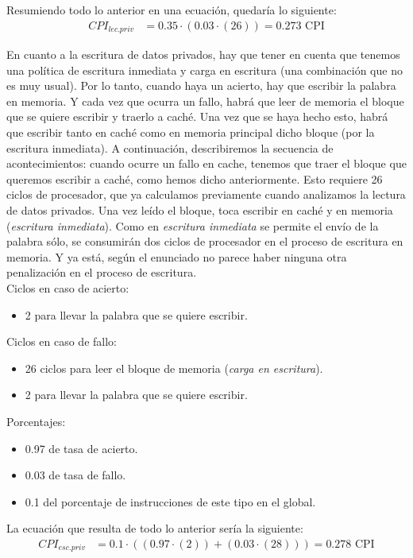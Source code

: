 \documentclass[12pt,a4paper]{article}
\begin{document}
Resumiendo todo lo anterior en una ecuación, quedaría lo siguiente:
\begin{align*}
CPI_{lec.priv}&=0.35\cdot (0.03\cdot (26))=0.273\text{ CPI}
\end{align*}

En cuanto a la escritura de datos privados, hay que tener en cuenta que tenemos una política de escritura inmediata y carga en escritura (una combinación que no es muy usual). Por lo tanto, cuando haya un acierto, hay que escribir la palabra en memoria. Y cada vez que ocurra un fallo, habrá que leer de memoria el bloque que se quiere escribir y traerlo a caché. Una vez que se haya hecho esto, habrá que escribir tanto en caché como en memoria principal dicho bloque (por la escritura inmediata). A continuación, describiremos la secuencia de acontecimientos: cuando ocurre un fallo en cache, tenemos que traer el bloque que queremos escribir a caché, como hemos dicho anteriormente. Esto requiere 26 ciclos de procesador, que ya calculamos previamente cuando analizamos la lectura de datos privados. Una vez leído el bloque, toca escribir en caché y en memoria (\textit{escritura inmediata}). Como en \textit{escritura inmediata} se permite el envío de la palabra sólo, se consumirán dos ciclos de procesador en el proceso de escritura en memoria. Y ya está, según el enunciado no parece haber ninguna otra penalización en el proceso de escritura.\\

Ciclos en caso de acierto:
\begin{itemize}
\item 2 para llevar la palabra que se quiere escribir.
\end{itemize}

Ciclos en caso de fallo:
\begin{itemize}
\item 26 ciclos para leer el bloque de memoria (\textit{carga en escritura}).
\item 2 para llevar la palabra que se quiere escribir.
\end{itemize}

Porcentajes:
\begin{itemize}
\item 0.97 de tasa de acierto.
\item 0.03 de tasa de fallo.
\item 0.1 del porcentaje de instrucciones de este tipo en el global.
\end{itemize}

La ecuación que resulta de todo lo anterior sería la siguiente:
\begin{align*}
CPI_{esc.priv}&=0.1\cdot ((0.97\cdot (2))+(0.03\cdot (28)))=0.278\text{ CPI}
\end{align*}
\end{document}
